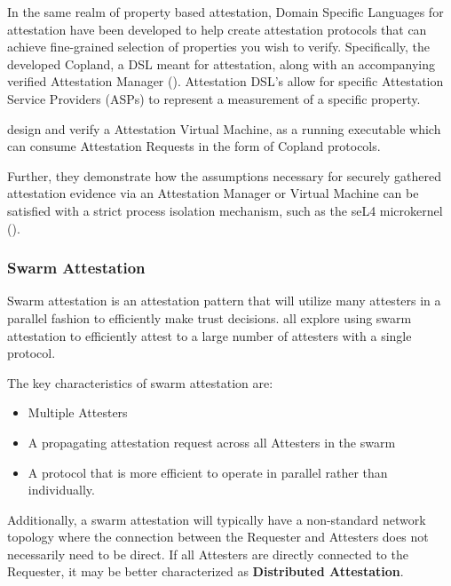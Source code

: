 \documentclass[acmsmall]{acmart}
\theoremstyle{definition}
\begin{document}
In the same realm of property based attestation, Domain Specific Languages for attestation have been developed to help create attestation protocols that can achieve fine-grained selection of properties you wish to verify. Specifically, the
\citet{copland-lang} developed Copland, a DSL meant for attestation,
along with an accompanying verified Attestation Manager (\citet{copland-avm-github}).
Attestation DSL's allow for specific Attestation Service Providers (ASPs) to represent a measurement of a
specific property.

\citet{Petz::2021::DesignProtocol} design and verify a Attestation Virtual Machine, as a running executable which can consume Attestation Requests in the form of Copland protocols.

Further, they demonstrate how the assumptions necessary for securely gathered attestation evidence
via an Attestation Manager or Virtual Machine can be satisfied with a strict process isolation mechanism, such as the seL4 microkernel (\citet{Klein:09:seL4:-formal-ve}).

\subsubsection{Swarm Attestation} \label{sec:Swarm-Attestation}
Swarm attestation is an attestation pattern that will utilize many attesters
in a parallel fashion to efficiently make trust decisions. \citet{ kuang2019esdra,carpent2017lightweight,Wedaj:2019:DDA:3328797.3325822}
all explore using swarm attestation to efficiently attest to a
large number of attesters with a single protocol.

\begin{flushleft}

  The key characteristics of swarm attestation are:
  \begin{itemize}
    \item Multiple Attesters
    \item A propagating attestation request across all Attesters in the swarm
    \item A protocol that is more efficient to operate in parallel rather than individually.
  \end{itemize}

  Additionally, a swarm attestation will typically have a
  non-standard network topology where the connection
  between the Requester and Attesters does not necessarily
  need to be direct. If all Attesters are directly connected
  to the Requester, it may be better characterized as
  \textbf{Distributed Attestation}.
\end{flushleft}
\end{document}
